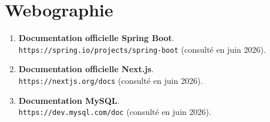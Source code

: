 \documentclass[12pt,a4paper]{report}
\begin{document}
\section*{Webographie}

\begin{enumerate}

\item \textbf{Documentation officielle Spring Boot}.\\
\texttt{https://spring.io/projects/spring-boot}
(consulté en juin 2026).

\item \textbf{Documentation officielle Next.js}.\\
\texttt{https://nextjs.org/docs}
(consulté en juin 2026).

\item \textbf{Documentation MySQL}.\\
\texttt{https://dev.mysql.com/doc}
(consulté en juin 2026).
\end{enumerate}
\end{document}
